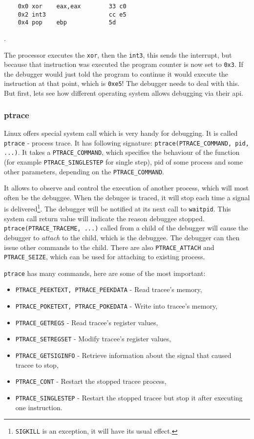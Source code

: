 \begin{lstlisting}
    0x0 xor    eax,eax        33 c0
    0x2 int3                  cc e5
    0x4 pop    ebp            5d
\end{lstlisting}.

The processor executes the \lstinline{xor}, then the \lstinline{int3}, this sends the interrupt, but because that instruction was executed the program counter is now set to \lstinline{0x3}. If the debugger would just told the program to continue it would execute the instruction at that point, which is \lstinline{0xe5}! The debugger needs to deal with this. But first, lets see how different operating system allows debugging via their api.

\subsubsection{ptrace}
Linux offers special system call which is very handy for debugging. It is called \lstinline{ptrace} \cite{ptrace} - process trace. It has following signature: \lstinline{ptrace(PTRACE_COMMAND, pid, ...)}. It takes a \lstinline{PTRACE_COMMAND}, which specifies the behaviour of the function (for example \lstinline{PTRACE_SINGLESTEP} for single step), pid of some process and some other parameters, depending on the \lstinline{PTRACE_COMMAND}. 

It allows to observe and control the execution of another process, which will most often be the debuggee. When the debugee is traced, it will stop each time a signal is delivered\footnote{\lstinline{SIGKILL} is an exception, it will have its usual effect.}. The debugger will be notified at its next call to \lstinline{waitpid}. This system call return value will indicate the reason debuggee stopped. \lstinline{ptrace(PTRACE_TRACEME, ...)} called from a child of the debugger will cause the debugger to \textit{attach} to the child, which is the debuggee. The debugger can then issue other commands to the child. There are also \lstinline{PTRACE_ATTACH} and \lstinline{PTRACE_SEIZE}, which can be used for attaching to existing process.

\lstinline{ptrace} has many commands, here are some of the most important:
\begin{itemize}
    \item \lstinline{PTRACE_PEEKTEXT, PTRACE_PEEKDATA} - Read tracee's memory,
    \item \lstinline{PTRACE_POKETEXT, PTRACE_POKEDATA} - Write into tracee's memory,
    \item \lstinline{PTRACE_GETREGS} - Read tracee's register values,
    \item \lstinline{PTRACE_SETREGSET} - Modify tracee's register values,
    \item \lstinline{PTRACE_GETSIGINFO} - Retrieve information about the signal that caused tracee to stop,
    \item \lstinline{PTRACE_CONT} - Restart the stopped tracee process,
    \item \lstinline{PTRACE_SINGLESTEP} - Restart the stopped tracee but stop it after executing one instruction.
\end{itemize}


